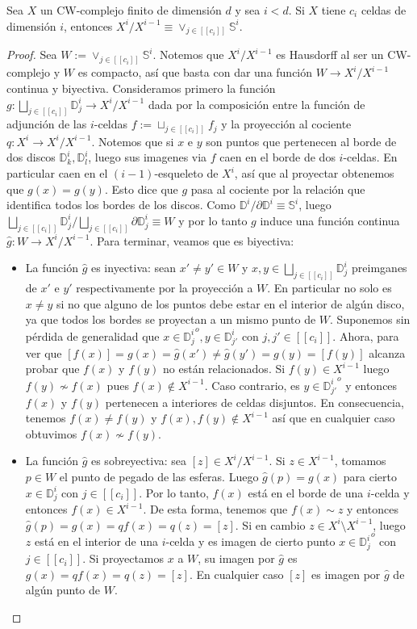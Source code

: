 \documentclass[11pt]{article}
\newcommand{\D}{\mathbb{D}}
\newcommand{\Ss}{\mathbb{S}}
\newcommand{\tint}[1]{#1^o}
\newcommand{\nat}[1]{[\![#1]\!]}
\newcommand{\paint}[2]{\color{#1}{#2}}
\newenvironment{lemma}[2][Lema]{\begin{trivlist}
\item[\hskip \labelsep \paint{orange}{{\bfseries #1}}\hskip \labelsep {\bfseries #2.}]}{\end{trivlist}}
\begin{document}
\begin{lemma}{2} Sea $X$ un CW-complejo finito de dimensi\'on $d$ y sea $i < d$. Si $X$ tiene $c_i$ celdas de dimensi\'on $i$, entonces $X^i/X^{i-1} \equiv \vee_{j \in \nat{c_i}}\Ss^i$.
\end{lemma}
\begin{proof} Sea $W := \vee_{j \in \nat{c_i}}\Ss^i$. Notemos que $X^i/X^{i-1}$ es Hausdorff al ser un CW-complejo y $W$ es compacto, as\'i que basta con dar una funci\'on $W \to X^i/X^{i-1}$ continua y biyectiva. Consideramos primero la funci\'on $g : \bigsqcup_{j \in \nat{c_i}}\D^i_j \to X^i/X^{i-1}$ dada por la composici\'on entre la funci\'on de adjunci\'on de las $i$-celdas $f := \sqcup_{j \in \nat{c_i}}f_j$ y la proyecci\'on al cociente $q : X^i \to X^i/X^{i-1}$. Notemos que si $x$ e $y$ son puntos que pertenecen al borde de dos discos $\D^i_k, \D^i_l$, luego sus imagenes via $f$ caen en el borde de dos $i$-celdas. En particular caen en el $(i-1)$-esqueleto de $X^i$, as\'i que al proyectar obtenemos que $g(x) = g(y)$. Esto dice que $g$ pasa al cociente por la relaci\'on que identifica todos los bordes de los discos. Como $\D^i/\partial \D^i \equiv \Ss^i$, luego $\bigsqcup_{j \in \nat{c_i}}\D^i_j/\bigsqcup_{j \in \nat{c_i}} \partial\D_j^i \equiv W$ y por lo tanto $g$ induce una funci\'on continua $\hat{g} : W \to X^i/X^{i-1}$. Para terminar, veamos que es biyectiva: 
\begin{itemize}
\item[$\bullet$] La funci\'on $\hat{g}$ es inyectiva: sean $x' \neq y' \in W$ y $x,y \in \bigsqcup_{j \in \nat{c_i}}\D^i_j$ preimganes de $x'$ e $y'$ respectivamente por la proyecci\'on a $W$. En particular no solo es $x \neq y$ si no que alguno de los puntos debe estar en el interior de alg\'un disco, ya que todos los bordes se proyectan a un mismo punto de $W$. Suponemos sin p\'erdida de generalidad que $x \in \tint{{\D^i_j}}, y \in \D^i_{j'}$ con $j,j' \in \nat{c_i}$. Ahora, para ver que $[f(x)] = g(x) = \hat{g}(x') \neq \hat{g}(y') = g(y) = [f(y)]$ alcanza probar que $f(x)$ y $f(y)$ no est\'an relacionados. Si $f(y) \in X^{i-1}$ luego $f(y) \not \sim f(x)$ pues $f(x) \not \in X^{i-1}$. Caso contrario, es $y \in \tint{{\D^i_{j'}}}$ y entonces $f(x)$ y $f(y)$ pertenecen a interiores de celdas disjuntos. En consecuencia, tenemos $f(x) \neq f(y)$ y $f(x),f(y) \not \in X^{i-1}$ as\'i que en cualquier caso obtuvimos $f(x) \not \sim f(y)$.
\item[$\bullet$] La funci\'on $\hat{g}$ es sobreyectiva: sea $[z] \in X^i/X^{i-1}$. Si $z \in X^{i-1}$, tomamos $p \in W$ el punto de pegado de las esferas. Luego $\hat{g}(p) = g(x)$ para cierto $x \in \D^i_j$ con $j \in \nat{c_i}$. Por lo tanto, $f(x)$ est\'a en el borde de una $i$-celda y entonces $f(x) \in X^{i-1}$. De esta forma, tenemos que $f(x) \sim z$ y entonces $\hat{g}(p) = g(x) = qf(x) = q(z) = [z]$. Si en cambio $z \in X^i \setminus X^{i-1}$, luego $z$ est\'a en el interior de una $i$-celda y es imagen de cierto punto $x \in \tint{{\D^i_j}}$ con $j \in \nat{c_i}$. Si proyectamos $x$ a $W$, su imagen por $\hat{g}$ es $g(x) = qf(x) = q(z) = [z]$. En cualquier caso $[z]$ es imagen por $\hat{g}$ de alg\'un punto de $W$.
\end{itemize}
\end{proof}
\end{document}
